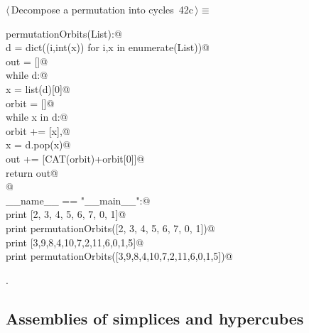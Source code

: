 \documentclass[11pt,oneside]{article}	%
\begin{document}
\begin{flushleft} \small \label{scrap91}
\protect{}$\langle\,$Decompose a permutation into cycles\nobreak\ {\footnotesize 42c}$\,\rangle\equiv$
\vspace{-1ex}
\begin{list}{}{} \item
\mbox{}\verb@def permutationOrbits(List):@\\
\mbox{}\verb@   d = dict((i,int(x)) for i,x in enumerate(List))@\\
\mbox{}\verb@   out = []@\\
\mbox{}\verb@   while d:@\\
\mbox{}\verb@      x = list(d)[0]@\\
\mbox{}\verb@      orbit = []@\\
\mbox{}\verb@      while x in d:@\\
\mbox{}\verb@         orbit += [x],@\\
\mbox{}\verb@         x = d.pop(x)@\\
\mbox{}\verb@      out += [CAT(orbit)+orbit[0]]@\\
\mbox{}\verb@   return out@\\
\mbox{}\verb@      @\\
\mbox{}\verb@if __name__ == "__main__":@\\
\mbox{}\verb@   print [2, 3, 4, 5, 6, 7, 0, 1]@\\
\mbox{}\verb@   print permutationOrbits([2, 3, 4, 5, 6, 7, 0, 1])@\\
\mbox{}\verb@   print [3,9,8,4,10,7,2,11,6,0,1,5]@\\
\mbox{}\verb@   print permutationOrbits([3,9,8,4,10,7,2,11,6,0,1,5])@\\
\mbox{}\verb@@{\NWsep}
\end{list}
\vspace{-1ex}
\footnotesize\addtolength{\baselineskip}{-1ex}
\begin{list}{}{\setlength{\itemsep}{-\parsep}\setlength{\itemindent}{-\leftmargin}}
\item {\NWtxtMacroNoRef}.
\end{list}
\end{flushleft}

\subsection{Assemblies of simplices and hypercubes}
\end{document}
